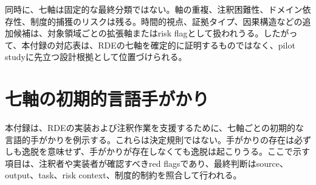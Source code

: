 \documentclass[
  a4paper]{ltjsarticle}
\begin{document}
同時に、七軸は固定的な最終分類ではない。軸の重複、注釈困難性、ドメイン依存性、制度的捕獲のリスクは残る。時間的視点、証拠タイプ、因果構造などの追加候補は、対象領域ごとの拡張軸またはrisk flagとして扱われうる。したがって、本付録の対応表は、RDEの七軸を確定的に証明するものではなく、pilot studyに先立つ設計根拠として位置づけられる。


\section{七軸の初期的言語手がかり}\label{appendix-c-linguistic-cues}

本付録は、RDEの実装および注釈作業を支援するために、七軸ごとの初期的な言語的手がかりを例示する。これらは決定規則ではない。手がかりの存在は必ずしも逸脱を意味せず、手がかりが存在しなくても逸脱は起こりうる。ここで示す項目は、注釈者や実装者が確認すべきred flagsであり、最終判断はsource、output、task、risk context、制度的制約を照合して行われる。
\end{document}
